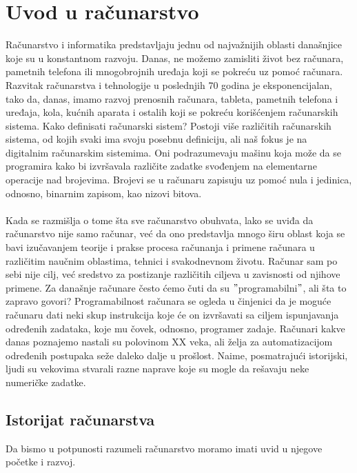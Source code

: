 \documentclass[a4paper]{article}
\begin{document}
\section{Uvod u računarstvo}
\label{sec:uvod}
Računarstvo i informatika predstavljaju jednu od najvažnijih oblasti današnjice koje su u konstantnom razvoju. Danas, ne možemo zamisliti život bez računara, pametnih telefona ili mnogobrojnih uređaja koji se pokreću uz pomoć računara. Razvitak računarstva i tehnologije u poslednjih 70 godina je eksponencijalan, tako da, danas, imamo razvoj prenosnih računara, tableta, pametnih telefona i uređaja, kola, kućnih aparata i ostalih koji se pokreću korišćenjem računarskih sistema. Kako definisati računarski sistem? Postoji više različitih računarskih sistema, od kojih svaki ima svoju posebnu definiciju, ali naš fokus je na digitalnim računarskim sistemima. Oni podrazumevaju mašinu koja može da se programira kako bi izvršavala različite zadatke svođenjem na elementarne operacije nad brojevima. Brojevi se u računaru zapisuju uz pomoć nula i jedinica, odnosno, binarnim zapisom, kao nizovi bitova. \\\\
Kada se razmišlja o tome šta sve računarstvo obuhvata, lako se uviđa da računarstvo nije samo računar, već da ono predstavlja mnogo širu oblast koja se bavi izučavanjem teorije i prakse procesa računanja i primene računara u različitim naučnim oblastima, tehnici i svakodnevnom životu. Računar sam po sebi nije cilj, već sredstvo za postizanje različitih ciljeva u zavisnosti od njihove primene. Za današnje računare često ćemo čuti da su $"$programabilni$"$, ali šta to zapravo govori? Programabilnost računara se ogleda u činjenici da je moguće računaru dati neki skup instrukcija koje će on izvršavati sa ciljem ispunjavanja određenih zadataka, koje mu čovek, odnosno, programer zadaje. Računari kakve danas poznajemo nastali su polovinom XX veka, ali želja za automatizacijom određenih postupaka seže daleko dalje u prošlost. Naime, posmatrajući istorijski, ljudi su vekovima stvarali razne naprave koje su mogle da rešavaju neke numeričke zadatke. 

\subsection{Istorijat računarstva}
Da bismo u potpunosti razumeli računarstvo moramo imati uvid u njegove početke i razvoj.
 
\end{document}
